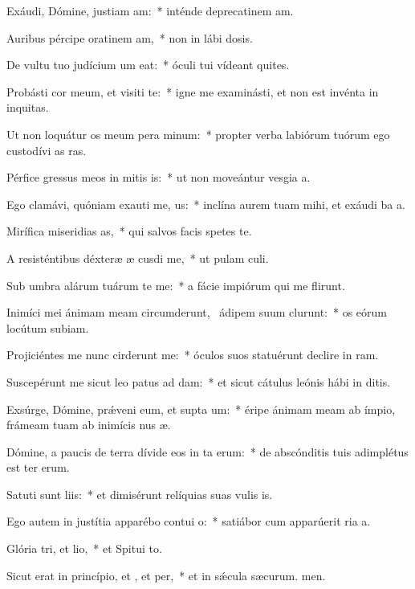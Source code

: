 \item Exáudi, Dómine, justiam am:~* inténde deprecatinem am.
\item Auribus pércipe oratinem am,~* non in lábi dosis.
\item De vultu tuo judícium um eat:~* óculi tui vídeant quites.
\item Probásti cor meum, et visiti te:~* igne me examinásti, et non est invénta in  inquitas.
\item Ut non loquátur os meum pera minum:~* propter verba labiórum tuórum ego custodívi as ras.
\item Pérfice gressus meos in mitis is:~* ut non moveántur vesgia a.
\item Ego clamávi, quóniam exauti me, us:~* inclína aurem tuam mihi, et exáudi ba a.
\item Mirífica miseridias as,~* qui salvos facis spetes  te.
\item A resisténtibus déxteræ æ cusdi me,~* ut pulam culi.
\item Sub umbra alárum tuárum te me:~* a fácie impiórum qui me flirunt.
\item Inimíci mei ánimam meam circumderunt,~\pscross{} ádipem suum clurunt:~* os eórum locútum  subiam.
\item Projiciéntes me nunc cirderunt me:~* óculos suos statuérunt declire in ram.
\item Suscepérunt me sicut leo patus ad dam:~* et sicut cátulus leónis hábi in ditis.
\item Exsúrge, Dómine, prǽveni eum, et supta um:~* éripe ánimam meam ab ímpio, frámeam tuam ab inimícis nus æ.
\item Dómine, a paucis de terra dívide eos in ta erum:~* de abscónditis tuis adimplétus est ter erum.
\item Satuti sunt liis:~* et dimisérunt relíquias suas vulis is.
\item Ego autem in justítia apparébo contui o:~* satiábor cum apparúerit ria a.
\item Glória tri, et lio,~* et Spitui to.
\item Sicut erat in princípio, et , et per,~* et in sǽcula sæcurum. men.

